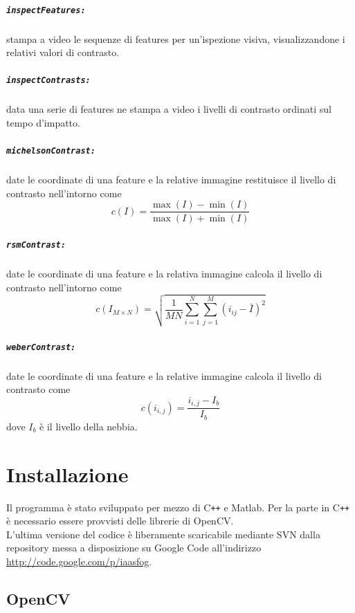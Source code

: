 \documentclass[12pt]{report}
\begin{document}
\paragraph*{\verb_inspectFeatures:_} stampa a video le sequenze di features per un'ispezione visiva, visualizzandone i relativi valori di contrasto.


\paragraph*{\verb_inspectContrasts:_} data una serie di features ne stampa a video i livelli di contrasto ordinati sul tempo d'impatto.

\paragraph*{\verb_michelsonContrast:_} date le coordinate di una feature e la relative immagine restituisce il livello di contrasto nell'intorno come $$c\left(I\right) = \frac{\max(I)-\min(I)}{\max(I)+\min(I)}$$

\paragraph*{\verb_rsmContrast:_} date le coordinate di una feature e la relativa immagine calcola il livello di contrasto nell'intorno come $$ c\left(I_{M\times N}\right) = \sqrt{\frac{1}{MN}\sum_{i=1}^N\sum_{j=1}^M(i_{ij}-\bar{I})^2} $$

\paragraph*{\verb_weberContrast:_} date le coordinate di una feature e la relative immagine calcola il livello di contrasto come $$c\left(i_{i,j}\right)= \frac{i_{i,j}-I_b}{I_b}$$ dove $I_b$ \`e il livello della nebbia.



\chapter{Installazione}
\noindent Il programma \`e stato sviluppato per mezzo di C\verb|++| e Matlab. Per la parte in C\verb|++| \`e necessario essere provvisti delle librerie di OpenCV.\\
L'ultima versione del codice \`e liberamente scaricabile mediante SVN dalla repository messa a disposizione su Google Code all'indirizzo \url{http://code.google.com/p/iaasfog}.
\section{OpenCV}
\end{document}
